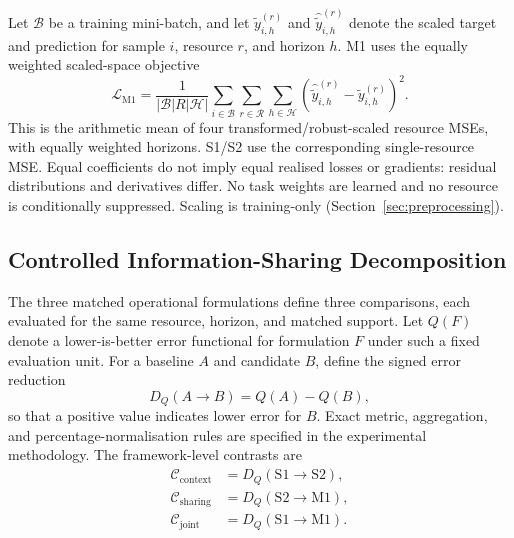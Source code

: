 \documentclass[a4paper,fleqn]{cas-dc}
\begin{document}
Let $\mathcal{B}$ be a training mini-batch, and let
$\widetilde{y}_{i,h}^{(r)}$ and
$\widehat{\widetilde{y}}_{i,h}^{(r)}$ denote the scaled target and prediction
for sample $i$, resource $r$, and horizon $h$. M1 uses the equally weighted
scaled-space objective
\begin{equation}
  \mathcal{L}_{\mathrm{M1}}
  = \frac{1}{|\mathcal{B}|R|\mathcal{H}|}
    \sum_{i\in\mathcal{B}}
    \sum_{r\in\mathcal{R}}
    \sum_{h\in\mathcal{H}}
    \left(
      \widehat{\widetilde{y}}_{i,h}^{(r)}
      - \widetilde{y}_{i,h}^{(r)}
    \right)^2.
  \label{eq:m1-loss}
\end{equation}
This is the arithmetic mean of four transformed/robust-scaled resource MSEs,
with equally weighted horizons. S1/S2 use the corresponding single-resource
MSE. Equal coefficients do not imply equal realised losses or gradients:
residual distributions and derivatives differ. No task weights are learned
and no resource is conditionally suppressed. Scaling is training-only
(Section~\ref{sec:preprocessing}).

\subsection{Controlled Information-Sharing Decomposition}
\label{sec:decomposition}

The three matched operational formulations define three comparisons, each evaluated for the same
resource, horizon, and matched support. Let $Q(F)$ denote a lower-is-better
error functional for formulation $F$ under such a fixed evaluation unit. For
a baseline $A$ and candidate $B$, define the signed error reduction
\begin{equation}
  D_Q(A\rightarrow B)=Q(A)-Q(B),
  \label{eq:controlled-reduction}
\end{equation}
so that a positive value indicates lower error for $B$. Exact metric,
aggregation, and percentage-normalisation rules are specified in the
experimental methodology. The framework-level contrasts are
\begin{equation}
  \begin{aligned}
    \mathcal{C}_{\mathrm{context}}
      &= D_Q(\mathrm{S1}\rightarrow\mathrm{S2}), \\
    \mathcal{C}_{\mathrm{sharing}}
      &= D_Q(\mathrm{S2}\rightarrow\mathrm{M1}), \\
    \mathcal{C}_{\mathrm{joint}}
      &= D_Q(\mathrm{S1}\rightarrow\mathrm{M1}).
  \end{aligned}
  \label{eq:controlled-contrasts}
\end{equation}
\end{document}
